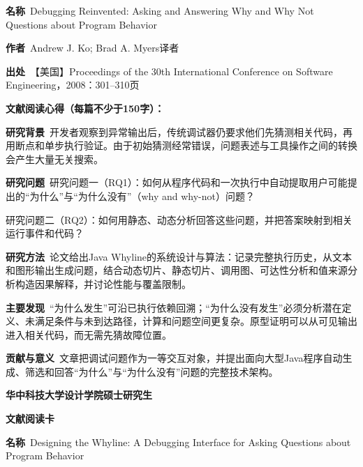 \vspace{0.35em}
\noindent\textbf{名称}\ Debugging Reinvented: Asking and Answering Why and Why Not Questions about Program Behavior\par
\noindent\textbf{作者}\ Andrew J. Ko; Brad A. Myers\quad 译者\par
\noindent\textbf{出处}\ 【美国】Proceedings of the 30th International Conference on Software Engineering，2008：301–310\quad 页\par
\vspace{0.35em}
\noindent\textbf{文献阅读心得（每篇不少于150字）：}\par
\noindent\textbf{研究背景}\ 开发者观察到异常输出后，传统调试器仍要求他们先猜测相关代码，再用断点和单步执行验证。由于初始猜测经常错误，问题表述与工具操作之间的转换会产生大量无关搜索。\par
\noindent\textbf{研究问题}\ 研究问题一（RQ1）：如何从程序代码和一次执行中自动提取用户可能提出的“为什么”与“为什么没有”（why and why-not）问题？\par
研究问题二（RQ2）：如何用静态、动态分析回答这些问题，并把答案映射到相关运行事件和代码？\par
\noindent\textbf{研究方法}\ 论文给出Java Whyline的系统设计与算法：记录完整执行历史，从文本和图形输出生成问题，结合动态切片、静态切片、调用图、可达性分析和值来源分析构造因果解释，并讨论性能与覆盖限制。\par
\noindent\textbf{主要发现}\ “为什么发生”可沿已执行依赖回溯；“为什么没有发生”必须分析潜在定义、未满足条件与未到达路径，计算和问题空间更复杂。原型证明可以从可见输出进入相关代码，而无需先猜故障位置。\par
\noindent\textbf{贡献与意义}\ 文章把调试问题作为一等交互对象，并提出面向大型Java程序自动生成、筛选和回答“为什么”与“为什么没有”问题的完整技术架构。\par
\clearpage
\begin{center}
{\songti\bfseries\fontsize{18.5pt}{27.75pt}\selectfont 华中科技大学设计学院硕士研究生\par}
{\songti\bfseries\fontsize{18.5pt}{27.75pt}\selectfont 文献阅读卡\par}
\end{center}
\vspace{0.25em}
\noindent\underline{}\par
\vspace{0.35em}
\noindent\textbf{名称}\ Designing the Whyline: A Debugging Interface for Asking Questions about Program Behavior\par
